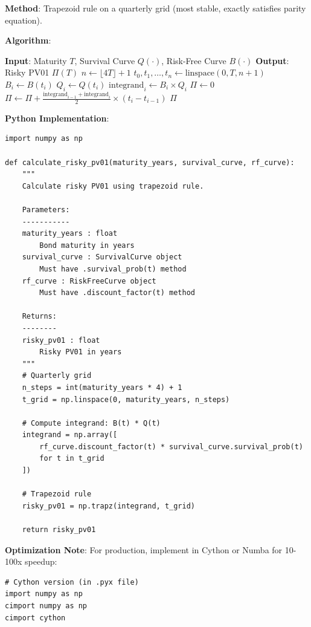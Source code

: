 \documentclass[11pt,a4paper]{article}
\begin{document}
\begin{implbox}
\textbf{Method}: Trapezoid rule on a quarterly grid (most stable, exactly satisfies parity equation).

\textbf{Algorithm}:

\begin{algorithm}[H]
\caption{Calculate Risky PV01}
\begin{algorithmic}[1]
\STATE \textbf{Input}: Maturity $T$, Survival Curve $Q(\cdot)$, Risk-Free Curve $B(\cdot)$
\STATE \textbf{Output}: Risky PV01 $\Pi(T)$
\STATE
\STATE $n \gets \lfloor 4T \rfloor + 1$ 
\STATE $t_0, t_1, \ldots, t_n \gets \text{linspace}(0, T, n+1)$
\STATE
{}
    \STATE $B_i \gets B(t_i)$ 
    \STATE $Q_i \gets Q(t_i)$ 
    \STATE $\text{integrand}_i \gets B_i \times Q_i$
\ENDFOR
\STATE
\STATE $\Pi \gets 0$
    \STATE $\Pi \gets \Pi + \frac{\text{integrand}_{i-1} + \text{integrand}_i}{2} \times (t_i - t_{i-1})$
\ENDFOR
\STATE
\RETURN $\Pi$
\end{algorithmic}
\end{algorithm}

\textbf{Python Implementation}:
\begin{lstlisting}
import numpy as np

def calculate_risky_pv01(maturity_years, survival_curve, rf_curve):
    """
    Calculate risky PV01 using trapezoid rule.
    
    Parameters:
    -----------
    maturity_years : float
        Bond maturity in years
    survival_curve : SurvivalCurve object
        Must have .survival_prob(t) method
    rf_curve : RiskFreeCurve object
        Must have .discount_factor(t) method
    
    Returns:
    --------
    risky_pv01 : float
        Risky PV01 in years
    """
    # Quarterly grid
    n_steps = int(maturity_years * 4) + 1
    t_grid = np.linspace(0, maturity_years, n_steps)
    
    # Compute integrand: B(t) * Q(t)
    integrand = np.array([
        rf_curve.discount_factor(t) * survival_curve.survival_prob(t)
        for t in t_grid
    ])
    
    # Trapezoid rule
    risky_pv01 = np.trapz(integrand, t_grid)
    
    return risky_pv01
\end{lstlisting}

\textbf{Optimization Note}: For production, implement in Cython or Numba for 10-100x speedup:
\begin{lstlisting}
# Cython version (in .pyx file)
import numpy as np
cimport numpy as np
cimport cython


\end{lstlisting}
\end{implbox}
\end{document}
